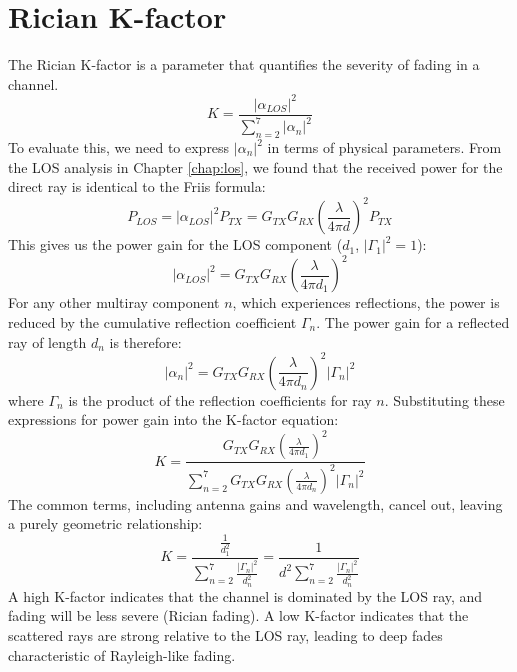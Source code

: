 \section{Rician K-factor}
The Rician K-factor is a parameter that quantifies the severity of fading in a channel. 
\begin{equation}
	K = \frac{|\alpha_{LOS}|^2}{\sum_{n=2}^{7} |\alpha_n|^2}
\end{equation}
To evaluate this, we need to express $|\alpha_n|^2$ in terms of physical parameters. From the LOS analysis in Chapter \ref{chap:los}, we found that the received power for the direct ray is identical to the Friis formula:
\begin{equation}
	P_{LOS} = |\alpha_{LOS}|^2 P_{TX} = G_{TX} G_{RX} \left( \frac{\lambda}{4\pi d} \right)^2 P_{TX}
\end{equation}
This gives us the power gain for the LOS component ($d_1$, $|\Gamma_1|^2=1$):
\begin{equation}
	|\alpha_{LOS}|^2 = G_{TX} G_{RX} \left( \frac{\lambda}{4\pi d_1} \right)^2
\end{equation}
For any other multiray component $n$, which experiences reflections, the power is reduced by the cumulative reflection coefficient $\Gamma_n$. The power gain for a reflected ray of length $d_n$ is therefore:
\begin{equation}
	|\alpha_n|^2 = G_{TX} G_{RX} \left( \frac{\lambda}{4\pi d_n} \right)^2 |\Gamma_n|^2
\end{equation}
where $\Gamma_n$ is the product of the reflection coefficients for ray $n$. Substituting these expressions for power gain into the K-factor equation:
\begin{equation}
	K = \frac{G_{TX} G_{RX} \left( \frac{\lambda}{4\pi d_1} \right)^2}{\sum_{n=2}^{7} G_{TX} G_{RX} \left( \frac{\lambda}{4\pi d_n} \right)^2 |\Gamma_n|^2}
\end{equation}
The common terms, including antenna gains and wavelength, cancel out, leaving a purely geometric relationship:
\begin{equation}
	K = \frac{\frac{1}{d_1^2}}{\sum_{n=2}^{7} \frac{|\Gamma_n|^2}{d_n^2}} = \frac{1}{d^2 \sum_{n=2}^{7} \frac{|\Gamma_n|^2}{d_n^2}}
\end{equation}
A high K-factor indicates that the channel is dominated by the LOS ray, and fading will be less severe (Rician fading). A low K-factor indicates that the scattered rays are strong relative to the LOS ray, leading to deep fades characteristic of Rayleigh-like fading.

